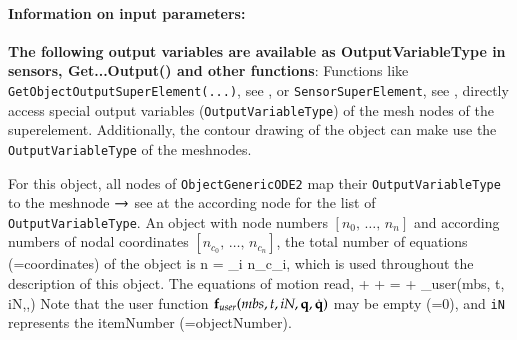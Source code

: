 \paragraph{Information on input parameters:} 
\finishTable
{\bf The following output variables are available as OutputVariableType in sensors, Get...Output() and other functions}: 
\finishTable
 \noindent
    Functions like \texttt{GetObjectOutputSuperElement(...)}, see , 
    or \texttt{SensorSuperElement}, see , directly access special output variables
    (\texttt{OutputVariableType}) of the mesh nodes of the superelement.
    Additionally, the contour drawing of the object can make use the \texttt{OutputVariableType} of the meshnodes.

    For this object, all nodes of \texttt{ObjectGenericODE2} map their \texttt{OutputVariableType} to the meshnode $\rightarrow$
    see at the according node for the list of \texttt{OutputVariableType}.
    An object with node numbers $[n_0,\,\ldots,\,n_n]$ and according numbers of nodal coordinates $[n_{c_0},\,\ldots,\,n_{c_n}]$, the total number of equations (=coordinates) of the object is
    \be
      n = \sum_{i} n_{c_i},
    \ee
    which is used throughout the description of this object.
    The equations of motion read,
    \be \label{eq_ObjectGenericODE2_EOM}
      \Mm \ddot \qv + \Dm \dot \qv + \Km \qv = \fv + \fv_{user}(mbs, t, iN,\qv,\dot \qv)
    \ee
    Note that the user function $\mathbf{f}_{user}(mbs, t, iN,\mathbf{q},\dot {\mathbf{q}})$ may be empty (=0), and \texttt{iN} represents the itemNumber (=objectNumber). 
    
